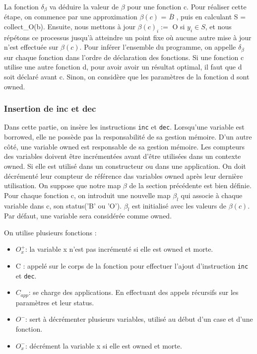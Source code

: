\documentclass{rapportECL}
\begin{document}
La fonction $\delta_{\beta}$ va déduire la valeur de $\beta$ pour une fonction c. 
Pour réaliser cette étape, on commence par une approximation $\beta(c)$ = $\overline{B}$ , puis en calculant S = collect\_O(b). 
Ensuite, nous mettons à jour  $\beta(c)_i :=$ O  si $y_i \in S $, et nous répétons ce processus jusqu'à atteindre un point fixe où aucune autre mise à jour 
n'est effectuée sur $\beta(c)$.
Pour inférer l'ensemble du programme, on appelle $\delta_{\beta}$ sur chaque fonction dans l'ordre de déclaration des fonctions. 
Si une fonction c utilise une autre fonction d, pour avoir avoir un résultat optimal, il faut que d soit déclaré avant c. 
Sinon, on considère que les paramètres de la fonction d sont owned.


\subsubsection{Insertion de inc et dec}
Dans cette partie, on insère les instructions \verb|inc| et \verb|dec|.
Lorsqu'une variable est borrowed, elle ne possède pas la responsabilité de sa gestion mémoire. 
D'un autre côté, une variable owned est responsable de sa gestion mémoire.
Les compteurs des variables doivent être incrémentées avant d'être utilisées dans un contexte owned. 
Si elle est utilisé dans un constructeur ou dans une application.
On doit décrémenté leur compteur de référence das variables owned après leur dernière utilisation. 
On suppose que notre map $\beta$ de la section précédente est bien définie. 
Pour chaque fonction c, on introduit une nouvelle map $\beta_l$ qui associe à chaque variable dans c, son status('B' ou 'O'). 
$\beta_l$ est initialisé avec les valeurs de $\beta(c)$. Par défaut, une variable sera considérée comme owned.

On utilise plusieurs fonctions :
\begin{itemize}
    \item $O_x^{+}$: la variable x n'est pas incrémenté si elle est owned et morte.
    \item C : appelé sur le corps de la fonction pour effectuer l'ajout d'instruction \verb|inc| et \verb|dec|.
    \item $C_{app}$: se charge des applications. En effectuant des appels récursifs sur les paramètres et leur status.
    \item $O^{-}$: sert à décrémenter plusieurs variables, utilisé au début d'un case et d'une fonction.
    \item  $O_x^{-}$: décrément la variable x si elle est owned et morte.   
\end{itemize}
\end{document}
